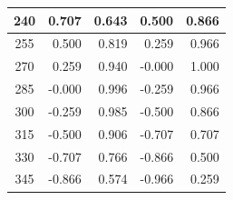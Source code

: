 \begin{table}[htbp]
\begin{center}
\begin{tabular}{|p{20mm}|p{20mm}|p{20mm}|p{20mm}|p{20mm}|}
            \multicolumn{1}{|c|}{240}                  & \multicolumn{1}{|r|}{0.707}                                  & \multicolumn{1}{|r|}{0.643}                                  & \multicolumn{1}{|r|}{0.500}                & \multicolumn{1}{|r|}{0.866}                \\ \hline
            \multicolumn{1}{|c|}{255}                  & \multicolumn{1}{|r|}{0.500}                                  & \multicolumn{1}{|r|}{0.819}                                  & \multicolumn{1}{|r|}{0.259}                & \multicolumn{1}{|r|}{0.966}                \\ \hline
            \multicolumn{1}{|c|}{270}                  & \multicolumn{1}{|r|}{0.259}                                  & \multicolumn{1}{|r|}{0.940}                                  & \multicolumn{1}{|r|}{-0.000}               & \multicolumn{1}{|r|}{1.000}                \\ \hline
            \multicolumn{1}{|c|}{285}                  & \multicolumn{1}{|r|}{-0.000}                                 & \multicolumn{1}{|r|}{0.996}                                  & \multicolumn{1}{|r|}{-0.259}               & \multicolumn{1}{|r|}{0.966}                \\ \hline
            \multicolumn{1}{|c|}{300}                  & \multicolumn{1}{|r|}{-0.259}                                 & \multicolumn{1}{|r|}{0.985}                                  & \multicolumn{1}{|r|}{-0.500}               & \multicolumn{1}{|r|}{0.866}                \\ \hline
            \multicolumn{1}{|c|}{315}                  & \multicolumn{1}{|r|}{-0.500}                                 & \multicolumn{1}{|r|}{0.906}                                  & \multicolumn{1}{|r|}{-0.707}               & \multicolumn{1}{|r|}{0.707}                \\ \hline
            \multicolumn{1}{|c|}{330}                  & \multicolumn{1}{|r|}{-0.707}                                 & \multicolumn{1}{|r|}{0.766}                                  & \multicolumn{1}{|r|}{-0.866}               & \multicolumn{1}{|r|}{0.500}                \\ \hline
            \multicolumn{1}{|c|}{345}                  & \multicolumn{1}{|r|}{-0.866}                                 & \multicolumn{1}{|r|}{0.574}                                  & \multicolumn{1}{|r|}{-0.966}               & \multicolumn{1}{|r|}{0.259}                \\ \hline
        \end{tabular}
    \end{center}
\end{table}

